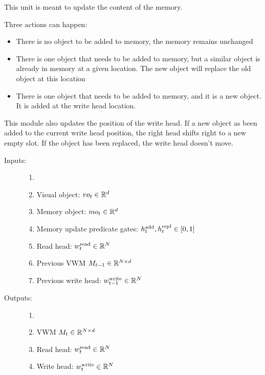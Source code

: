 
This unit is meant to update the content of the memory. 

Three actions can happen:

\begin{itemize}
	\item There is no object to be added to memory, the memory remains unchanged
	\item There is one object that needs to be added to memory, but a similar object is already in memory at a given location. The new object will replace the old object at this location
	
	\item There is one object that needs to be added to memory, and  it is a new object. It is added at the write head location.
\end{itemize}


This module also updates the position of the write head. If a new object as been added to the current write head position, the right head shifts right to a new empty slot. If the object has been replaced, the write head doesn't move.

\begin{description}
	\item[Inputs:] 
	\begin{enumerate}
		\item[]
		\item Visual object: $vo_t \in \mathbb{R}^d$
		\item Memory object: $mo_t \in \mathbb{R}^d$
		\item Memory update predicate gates:  $h^{\mathrm{add}}_t, h^{\mathrm{repl}}_t \in [0,1]$
		\item Read head: $w^{\mathrm{read}}_t \in \mathbb{R}^N$
		\item Previous VWM $M_{t-1} \in \mathbb{R}^{N \times d}$
		\item Previous write head: $w^{\mathrm{write}}_{t-1} \in \mathbb{R}^N$
	\end{enumerate}

	\item[Outputs:] 
	\begin{enumerate}
		\item[]
		\item VWM $M_t \in \mathbb{R}^{N \times d}$
		\item Read head: $w^{\mathrm{read}}_t \in \mathbb{R}^N$
		\item Write head: $w^{\mathrm{write}}_t \in \mathbb{R}^N$
	\end{enumerate}

\end{description}



